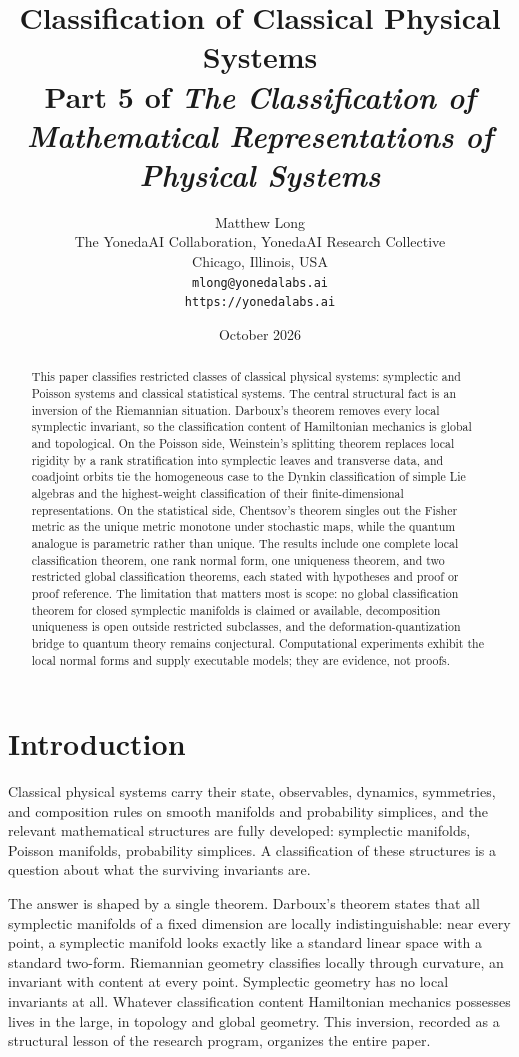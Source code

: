 \documentclass[11pt,letterpaper]{article}
\title{Classification of Classical Physical Systems\\[4pt]
  {\normalsize Part 5 of \emph{The Classification of Mathematical Representations of Physical Systems}}}
\author{Matthew Long\\
  \small The YonedaAI Collaboration, YonedaAI Research Collective\\
  \small Chicago, Illinois, USA\\
  \small \texttt{mlong@yonedalabs.ai}\\
  \small \texttt{https://yonedalabs.ai}}
\date{October 2026}
\theoremstyle{definition}
\theoremstyle{remark}
\begin{document}
\maketitle

\begin{abstract}
This paper classifies restricted classes of classical physical systems: symplectic and Poisson systems and classical statistical systems. The central structural fact is an inversion of the Riemannian situation. Darboux's theorem removes every local symplectic invariant, so the classification content of Hamiltonian mechanics is global and topological. On the Poisson side, Weinstein's splitting theorem replaces local rigidity by a rank stratification into symplectic leaves and transverse data, and coadjoint orbits tie the homogeneous case to the Dynkin classification of simple Lie algebras and the highest-weight classification of their finite-dimensional representations. On the statistical side, Chentsov's theorem singles out the Fisher metric as the unique metric monotone under stochastic maps, while the quantum analogue is parametric rather than unique. The results include one complete local classification theorem, one rank normal form, one uniqueness theorem, and two restricted global classification theorems, each stated with hypotheses and proof or proof reference. The limitation that matters most is scope: no global classification theorem for closed symplectic manifolds is claimed or available, decomposition uniqueness is open outside restricted subclasses, and the deformation-quantization bridge to quantum theory remains conjectural. Computational experiments exhibit the local normal forms and supply executable models; they are evidence, not proofs.
\end{abstract}

\section{Introduction}

Classical physical systems carry their state, observables, dynamics, symmetries, and composition rules on smooth manifolds and probability simplices, and the relevant mathematical structures are fully developed: symplectic manifolds, Poisson manifolds, probability simplices. A classification of these structures is a question about what the surviving invariants are.

The answer is shaped by a single theorem. Darboux's theorem states that all symplectic manifolds of a fixed dimension are locally indistinguishable: near every point, a symplectic manifold looks exactly like a standard linear space with a standard two-form. Riemannian geometry classifies locally through curvature, an invariant with content at every point. Symplectic geometry has no local invariants at all. Whatever classification content Hamiltonian mechanics possesses lives in the large, in topology and global geometry. This inversion, recorded as a structural lesson of the research program, organizes the entire paper.
\end{document}
